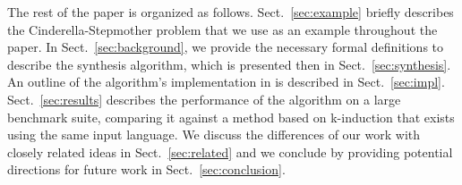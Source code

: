 The rest of the paper is organized as follows. Sect.~\ref{sec:example} briefly describes the Cinderella-Stepmother problem that we use as an example throughout the paper. In Sect.~\ref{sec:background}, we provide the necessary formal definitions to describe the synthesis algorithm, which is presented then in Sect.~\ref{sec:synthesis}.
An outline of the algorithm's implementation in \jkind is described in Sect.~\ref{sec:impl}. Sect.~\ref{sec:results} describes the performance of the algorithm on a large benchmark suite, comparing it against a method based on k-induction that exists using the same input language.  We discuss the differences of our work with closely related ideas in Sect.~\ref{sec:related} and we conclude by providing potential directions for future work in Sect.~\ref{sec:conclusion}.

	
